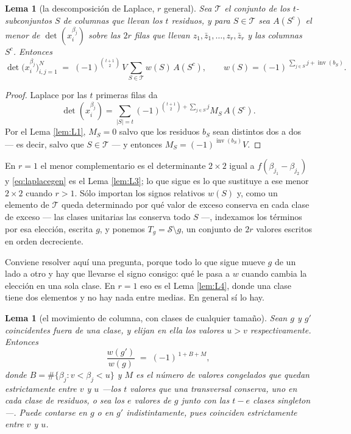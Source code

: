 \documentclass[11pt,reqno]{amsart}
\theoremstyle{plain}
\newtheorem{lemma}[theorem]{Lema}
\theoremstyle{definition}
\newcommand{\inv}{\operatorname{inv}}
\newcommand{\zb}{\bar z}
\begin{document}
\begin{lemma}[la descomposición de Laplace, $r$ general]\label{lem:L3gen}
Sea $\mathcal T$ el conjunto de los $t$-subconjuntos $S$ de columnas que llevan los $t$ residuos, y
para $S\in\mathcal T$ sea $A(S^{c})$ el menor de $\det(x_i^{\beta_j})$ sobre las $2r$ filas que
llevan $z_1,\zb_1,\dots,z_r,\zb_r$ y las columnas $S^{c}$. Entonces
\begin{equation}\label{eq:laplacegen}
  \det\bigl(x_i^{\beta_j}\bigr)_{i,j=1}^{N}
  \;=\;(-1)^{\binom{t+1}{2}}\,V\sum_{S\in\mathcal T}w(S)\,A(S^{c}),
  \qquad
  w(S)=(-1)^{\,\sum_{j\in S}j+\inv(b_S)} .
\end{equation}
\end{lemma}

\begin{proof}
Laplace por las $t$ primeras filas da
\[
\det(x_i^{\beta_j})=\sum_{|S|=t}(-1)^{\binom{t+1}{2}+\sum_{j\in S}j}M_S\,A(S^{c}).
\]
Por el Lema
\ref{lem:L1}, $M_S=0$ salvo que los residuos $b_S$ sean distintos dos a dos --- es decir, salvo que
$S\in\mathcal T$ --- y entonces $M_S=(-1)^{\inv(b_S)}V$.
\end{proof}

En $r=1$ el menor complementario es el determinante $2\times2$ igual a $f(\beta_{j_1}-\beta_{j_2})$ y
\eqref{eq:laplacegen} es el Lema \ref{lem:L3}; lo que sigue es lo que sustituye a ese menor
$2\times2$ cuando $r>1$. Sólo importan los signos relativos $w(S)$ y, como un elemento de
$\mathcal T$ queda determinado por qué valor de exceso conserva en cada clase de exceso --- las
clases unitarias las conserva todo $S$ ---, indexamos los términos por esa elección, escrita $g$, y
ponemos $T_g=\mathcal{S}\setminus g$, un conjunto de $2r$ valores escritos en orden decreciente.

Conviene resolver aquí una pregunta, porque todo lo que sigue mueve $g$ de un lado a otro y hay que
llevarse el signo consigo: qué le pasa a $w$ cuando cambia la elección en una sola clase. En $r=1$
eso es el Lema \ref{lem:L4}, donde una clase tiene dos elementos y no hay nada entre medias. En
general sí lo hay.

\begin{lemma}[el movimiento de columna, con clases de cualquier tamaño]\label{lem:step}
Sean $g$ y $g'$ coincidentes fuera de una clase, y elijan en ella los valores $u>v$ respectivamente.
Entonces
\begin{equation}\label{eq:step}
\frac{w(g')}{w(g)}\;=\;(-1)^{\,1+B+M},
\end{equation}
donde $B=\#\{\beta_j:v<\beta_j<u\}$ y $M$ es el número de valores \emph{congelados} que quedan
estrictamente entre $v$ y $u$ ---los $t$ valores que una transversal conserva, uno en cada clase de
residuos, o sea los $e$ valores de $g$ junto con las $t-e$ clases singleton---. Puede contarse en $g$
o en $g'$ indistintamente, pues coinciden estrictamente entre $v$ y $u$.
\end{lemma}
\end{document}
